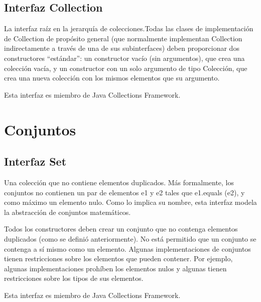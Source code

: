 \documentclass[11pt]{article}
\begin{document}
\subsection{Interfaz Collection}
\par
La interfaz raíz en la jerarquía de colecciones.Todas las clases de 
implementación de Collection de propósito general (que normalmente 
implementan Collection indirectamente a través de una de sus 
subinterfaces) deben proporcionar dos constructores ``estándar'': un 
constructor vacío (sin argumentos), que crea una colección vacía, y 
un constructor con un solo argumento de tipo Colección, que crea una 
nueva colección con los mismos elementos que su argumento. 

\par
Esta interfaz es miembro de Java Collections Framework.


\section{Conjuntos}

\subsection{Interfaz Set}
\par
Una colección que no contiene elementos duplicados. Más formalmente, 
los conjuntos no contienen un par de elementos e1 y e2 tales que 
e1.equals (e2), y como máximo un elemento nulo. Como lo implica su 
nombre, esta interfaz modela la abstracción de conjuntos matemáticos.
\par
Todos los constructores deben crear un conjunto que no contenga 
elementos duplicados (como se definió anteriormente). No está 
permitido que un conjunto se contenga a sí mismo como un elemento. 
Algunas implementaciones de conjuntos tienen restricciones sobre los 
elementos que pueden contener. Por ejemplo, algunas implementaciones 
prohíben los elementos nulos y algunas tienen restricciones sobre los 
tipos de sus elementos.
\par
Esta interfaz es miembro de Java Collections Framework.
\end{document}
